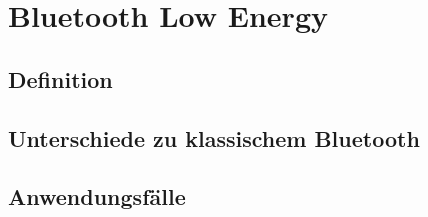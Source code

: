 \chapter{Bluetooth Low Energy}
\label{ch:ble}

\section{Definition}

\section{Unterschiede zu klassischem Bluetooth}

\section{Anwendungsfälle}


